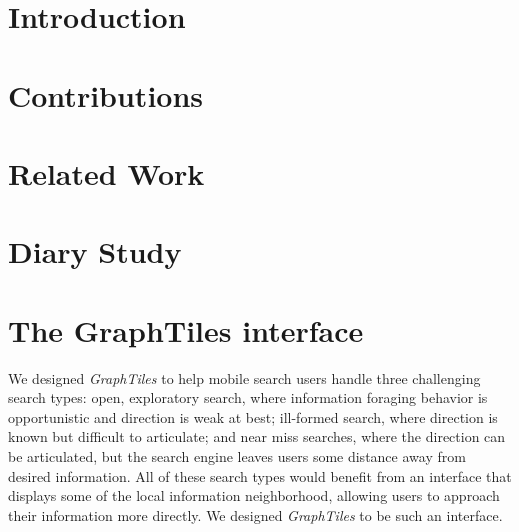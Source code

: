 \documentclass{sigchi}
\begin{document}









\section{Introduction}



\section{Contributions}



\section{Related Work}



\section{Diary Study}





\section{The GraphTiles interface}
We designed \textit{GraphTiles} to help mobile search users handle three challenging search types: open, exploratory search, where information foraging behavior is opportunistic and direction is weak at best; ill-formed search, where direction is known but difficult to articulate; and near miss searches, where the direction can be articulated, but the search engine leaves users some distance away from desired information. All of these search types would benefit from an interface that displays some of the local information neighborhood, allowing users to approach their information more directly. 
We designed \textit{GraphTiles} to be such an interface. 
\end{document}

